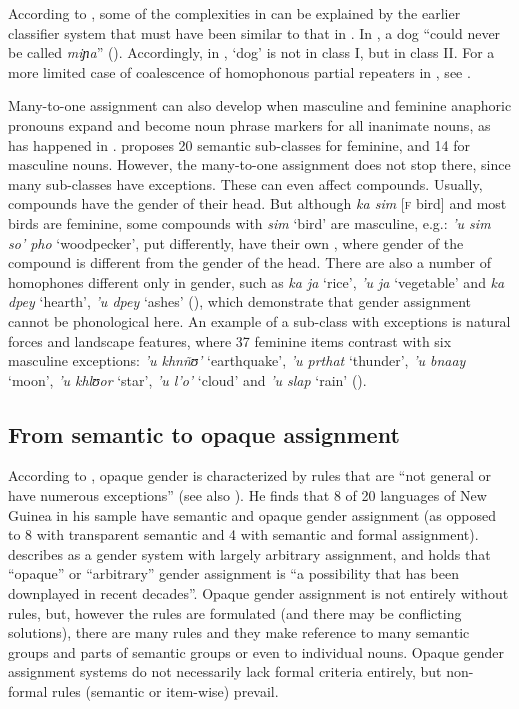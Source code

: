 \documentclass[output=collectionpaper]{langsci/langscibook}
\begin{document}
According to \cite{Plaster2007}, some of the complexities in  can be explained by the earlier classifier system that must have been similar to that in . In , a dog ``could never be called \textit{miɲa}'' (\citealt[490]{Dixon1977a}). Accordingly, in , `dog' is not in class I, but in class II. For a more limited case of coalescence of homophonous partial repeaters in , see \cite[22]{Seifart2018}.

Many-to-one assignment can also develop when masculine and feminine anaphoric pronouns expand and become noun phrase markers for all inanimate nouns, as has happened in . \cite{Rabel-Heymann1977} proposes 20 semantic sub-classes for feminine, and 14 for masculine nouns. However, the many-to-one assignment does not stop there, since many sub-classes have exceptions. These can even affect compounds. Usually,  compounds have the gender of their head. But although \textit{ka sim} [\textsc{f} bird] and most birds are feminine, some compounds with \textit{sim} `bird' are masculine, e.g.: \textit{'u sim so' pho} `woodpecker', put differently, have their own , where gender of the compound is different from the gender of the head. There are also a number of homophones different only in gender, such as \textit{ka ja} `rice', \textit{'u ja} `vegetable' and \textit{ka dpey} `hearth', \textit{'u dpey} `ashes' (\citealt[271]{Rabel-Heymann1977}), which demonstrate that gender assignment cannot be phonological here. An example of a sub-class with exceptions is natural forces and landscape features, where 37 feminine items contrast with six masculine exceptions: \textit{'u khnñʊ'} `earthquake', \textit{'u prthat} `thunder', \textit{'u bnaay} `moon', \textit{'u khlʊor} `star', \textit{'u l'o'} `cloud' and \textit{'u slap} `rain' (\citealt[265]{Rabel-Heymann1977}).

  \subsection{From semantic to opaque assignment}
\label{sec:WDG:6.3}

According to , opaque gender is characterized by rules that are ``not general or have numerous exceptions'' (see also ). He finds that 8 of 20 languages of New Guinea in his sample have semantic and opaque gender assignment (as opposed to 8 with transparent semantic and 4 with semantic and formal assignment).  describes  as a gender system with largely arbitrary assignment, and  holds that ``opaque'' or ``arbitrary'' gender assignment is ``a possibility that has been downplayed in recent decades''. Opaque gender assignment is not entirely without rules, but, however the rules are formulated (and there may be conflicting solutions), there are many rules and they make reference to many semantic groups and parts of semantic groups or even to individual nouns. Opaque gender assignment systems do not necessarily lack formal criteria entirely, but non-formal rules (semantic or item-wise) prevail.
\end{document}
